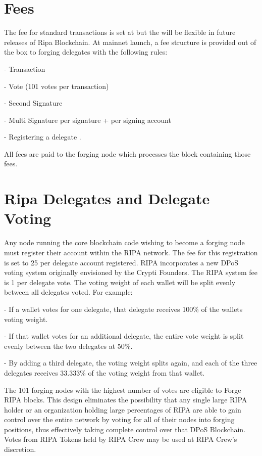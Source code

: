 \documentclass[11pt,fleqn,oneside]{book} %
\begin{document}
\section{Fees}
The fee for standard transactions is set at  but the will be flexible in future releases of Ripa Blockchain.
At mainnet launch, a fee structure is provided out of the box to forging delegates with the following rules:
	\begin{description}
		\item - Transaction 
		\item - Vote  (101 votes per transaction)
		\item - Second Signature 
		\item - Multi Signature  per signature +  per signing account
		\item - Registering a delegate .
	\end{description}
All fees are paid to the forging node which processes the block containing those fees.

\section{Ripa Delegates and Delegate Voting}
Any node running the core blockchain code wishing to become a forging node must
register their account within the RIPA network. The fee for this registration is set to
25 \PHP per delegate account registered.
RIPA incorporates a new DPoS voting system originally envisioned by the Crypti
Founders. The RIPA system fee is 1 \PHP per delegate vote. The voting weight of each
wallet will be split evenly between all delegates voted. For example:
\begin{description}
	\item - If a wallet votes for one delegate, that delegate receives 100\% of the wallets
voting weight.
	\item - If that wallet votes for an additional delegate, the entire vote weight is split
evenly between the two delegates at 50\%.
	\item - By adding a third delegate, the voting weight splits again, and each of the
three delegates receives 33.333\% of the voting weight from that wallet.
\end{description}

The 101 forging nodes with the highest number of votes are eligible to Forge RIPA
blocks. This design eliminates the possibility that any single large RIPA holder or an
organization holding large percentages of RIPA are able to gain control over the
entire network by voting for all of their nodes into forging positions, thus effectively
taking complete control over that DPoS Blockchain. Votes from RIPA Tokens held by
RIPA Crew may be used at RIPA Crew's discretion.
\end{document}
